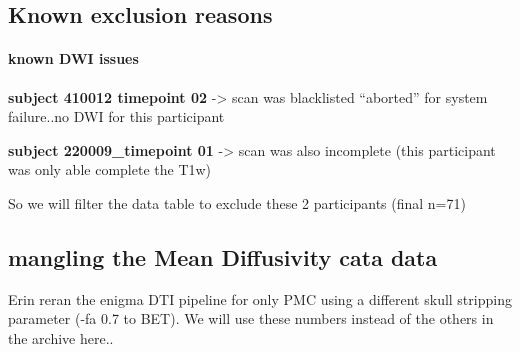 \documentclass[]{article}
\newenvironment{Shaded}{\begin{snugshade}}{\end{snugshade}}
\newcommand{\KeywordTok}[1]{\textcolor[rgb]{0.13,0.29,0.53}{\textbf{#1}}}
\newcommand{\StringTok}[1]{\textcolor[rgb]{0.31,0.60,0.02}{#1}}
\newcommand{\OperatorTok}[1]{\textcolor[rgb]{0.81,0.36,0.00}{\textbf{#1}}}
\newcommand{\NormalTok}[1]{#1}
\let\oldparagraph\paragraph
\renewcommand{\paragraph}[1]{\oldparagraph{#1}\mbox{}}
\theoremstyle{definition}
\theoremstyle{definition}
\theoremstyle{definition}
\theoremstyle{remark}
\begin{document}
\subsection{Known exclusion reasons}\label{known-exclusion-reasons-1}

\paragraph{known DWI issues}\label{known-dwi-issues-1}

\textbf{subject 410012 timepoint 02} -\textgreater{} scan was
blacklisted ``aborted'' for system failure..no DWI for this participant

\textbf{subject 220009\_timepoint 01} -\textgreater{} scan was also
incomplete (this participant was only able complete the T1w)

So we will filter the data table to exclude these 2 participants (final
n=71)

\begin{Shaded}
\end{Shaded}

\subsection{mangling the Mean Diffusivity cata
data}\label{mangling-the-mean-diffusivity-cata-data-1}

Erin reran the enigma DTI pipeline for only PMC using a different skull
stripping parameter (-fa 0.7 to BET). We will use these numbers instead
of the others in the archive here..
\end{document}
